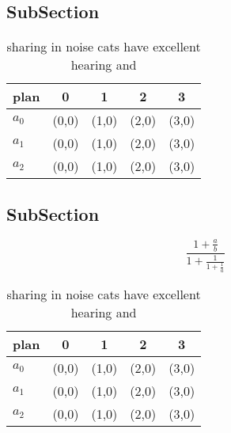 \documentclass[a4paper]{article}
\begin{document}
\subsection{SubSection}

\begin{table}
\begin{adjustbox}{width=0.6\columnwidth}
\begin{tabular}{|l|l|l|l|l|}
\hline
\textbf{plan} & \multicolumn{1}{c|}{\textbf{0}} & \multicolumn{1}{c|}{\textbf{1}} & \multicolumn{1}{c|}{\textbf{2}} & \multicolumn{1}{c|}{\textbf{3}} \\ \hline
\textbf{$a_0$}  & (0,0) & (1,0) & (2,0) & (3,0) \\ \hline
\textbf{$a_1$}  & (0,0) & (1,0) & (2,0) & (3,0) \\ \hline
\textbf{$a_2$}  & (0,0) & (1,0) & (2,0) & (3,0) \\ \hline
\end{tabular}
\end{adjustbox}
\caption{sharing in noise cats have excellent hearing and 
}
\end{table}

\subsection{SubSection}

\[ \frac{1+\frac{a}{b}}{1+\frac{1}{1+\frac{1}{a}}} \]

\begin{table}
\begin{adjustbox}{width=0.6\columnwidth}
\begin{tabular}{|l|l|l|l|l|}
\hline
\textbf{plan} & \multicolumn{1}{c|}{\textbf{0}} & \multicolumn{1}{c|}{\textbf{1}} & \multicolumn{1}{c|}{\textbf{2}} & \multicolumn{1}{c|}{\textbf{3}} \\ \hline
\textbf{$a_0$}  & (0,0) & (1,0) & (2,0) & (3,0) \\ \hline
\textbf{$a_1$}  & (0,0) & (1,0) & (2,0) & (3,0) \\ \hline
\textbf{$a_2$}  & (0,0) & (1,0) & (2,0) & (3,0) \\ \hline
\end{tabular}
\end{adjustbox}
\caption{sharing in noise cats have excellent hearing and 
}
\end{table}
\end{document}
